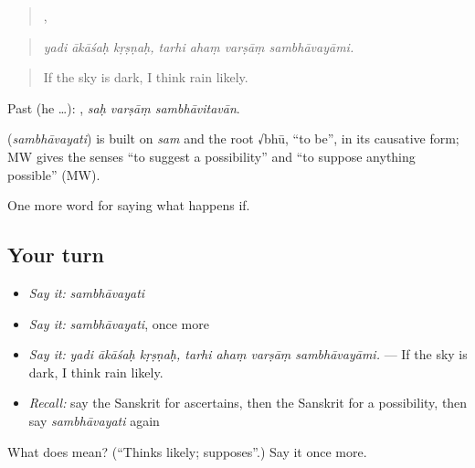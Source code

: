 \begin{quote}
  ,    
\end{quote}

\begin{quote}
\emph{yadi ākāśaḥ kṛṣṇaḥ, tarhi ahaṃ varṣāṃ sambhāvayāmi.}
\end{quote}

\begin{quote}
If the sky is dark, I think rain likely.
\end{quote}

Past (he …):   , \emph{saḥ varṣāṃ sambhāvitavān}.

\begin{cousinweb}
\textbf{} (\emph{sambhāvayati}) is built on \emph{sam} and the root √bhū, \textquotedblleft{}to be\textquotedblright{}, in its causative form; MW gives the senses \textquotedblleft{}to suggest a possibility\textquotedblright{} and \textquotedblleft{}to suppose anything possible\textquotedblright{} (MW).
\end{cousinweb}

\begin{grammarlens}[title={What you've built}]
One more word for saying what happens if.
\end{grammarlens}

\subsection*{Your turn}
\begin{itemize}
\raggedright
  \item \emph{Say it:} \emph{sambhāvayati}
  \item \emph{Say it:} \emph{sambhāvayati}, once more
  \item \emph{Say it:} \emph{yadi ākāśaḥ kṛṣṇaḥ, tarhi ahaṃ varṣāṃ sambhāvayāmi.} — If the sky is dark, I think rain likely.
  \item \emph{Recall:} say the Sanskrit for ascertains, then the Sanskrit for a possibility, then say \emph{sambhāvayati} again
\end{itemize}

\begin{tcolorbox}[breakable,colback=teal!4,colframe=teal!35!black,title={Before you move on}]
What does  mean? (\textquotedblleft{}Thinks likely; supposes\textquotedblright{}.) Say it once more.
\end{tcolorbox}
